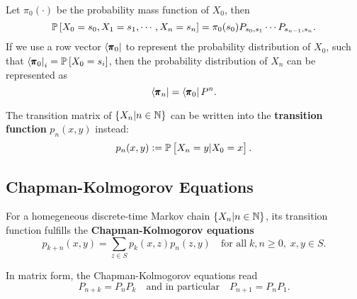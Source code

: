 \begin{proposition}
    Let $\pi_{0}(\cdot)$ be the probability mass function of $X_0$, then
    \begin{equation*}
        \mathbb{P} \left[ X_0 = s_0, X_1 = s_1, \cdots, X_n = s_n \right] = \pi_{0} (s_0) P_{s_0, s_1} \cdots P_{s_{n-1}, s_n}.
    \end{equation*} 
    If we use a row vector $\left< \pmb{\pi}_{0} \right| $ to represent the probability distribution of $X_0$, such that $\left< {\pmb{\pi}_{0}} \right|_i = \mathbb{P} \left[ X_0 = s_i \right]$, then the probability distribution of $X_n$ can be represented as
    \begin{equation*}
        \left< \pmb{\pi}_{n}  \right| = \left< \pmb{\pi}_{0} \right| P^n.
    \end{equation*}
\end{proposition}


\begin{definition}
    The transition matrix of $\{X_n | n \in \mathbb{N}\}$ can be written into the \textbf{transition function} $p_n(x,y)$ instead:
    \begin{equation*}
        p_n(x,y) := \mathbb{P} \left[ X_n = y | X_0 = x \right].
    \end{equation*}
\end{definition}

\subsection{Chapman-Kolmogorov Equations}

\begin{theorem}
    For a homegeneous discrete-time Markov chain $\{X_n | n \in \mathbb{N}\}$, its transition function fulfills the \textbf{Chapman-Kolmogorov equations}
    \begin{equation*}
        p_{k+n}(x,y) = \sum_{z \in S} p_k(x,z) p_n(z, y) \quad \text{for all} \; k, n \ge 0, \; x, y \in S.
    \end{equation*}
\end{theorem}

\begin{remark}
    In matrix form, the Chapman-Kolmogorov equations read 
    \begin{equation*}
        P_{n+k} = P_n P_k \quad \text{and in particular} \quad P_{n+1} = P_n P_1.
    \end{equation*}
\end{remark}

